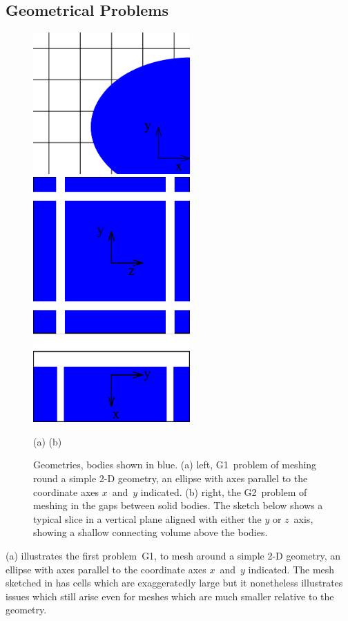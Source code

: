 \subsection{Geometrical Problems}\label{sec:geomprob}
\begin{figure}[h]
\centerline{\includegraphics[width=6cm]{../pics/mesh}
\hspace{1cm}\includegraphics[width=6cm]{../pics/g12}
}
\centerline{(a) \hspace{7cm}(b)}
\caption{Geometries, bodies shown in blue. (a) left, G1~problem of meshing round a simple 2-D geometry, an ellipse
with axes parallel to the coordinate axes $x$~and~$y$ indicated.
(b) right, the G2~problem of meshing in the gaps between solid bodies.
The sketch below
shows a typical slice in a vertical plane aligned with either the $y$ or $z$~axis,
showing a shallow connecting volume above the bodies.
\label{fig:mesh}}
\end{figure}
(a) illustrates the first problem~G1, to mesh around a simple 2-D geometry, an ellipse
with axes parallel to the coordinate axes $x$~and~$y$ indicated.
The mesh sketched in  has cells which are exaggeratedly large
but it nonetheless illustrates issues which still arise even for meshes which are much
smaller relative to the geometry.

